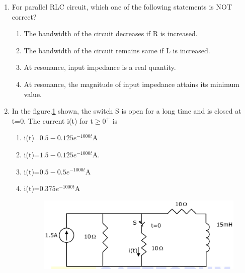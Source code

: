 \documentclass[journal,12pt,twocolumn]{IEEEtran}
\begin{document}
\begin{enumerate}
\item For parallel RLC circuit, which one of the following statements is NOT correct?
\begin{enumerate}
\setlength\itemsep{2em}
\item The bandwidth of the circuit decreases if R is increased.
\item The bandwidth of the circuit remains same if L is increased.
\item At resonance, input impedance is a real quantity.
\item At resonance, the magnitude of input impedance attains its minimum value.
\end{enumerate}

\item In the figure.\ref{fig76} shown, the switch S is open for a long time and is closed at t=0. The
current i(t) for t$\geq0^{+}$ is
\begin{enumerate}
\setlength\itemsep{2em}
\item i(t)=$0.5-0.125e^{-1000t}$A
\item i(t)=$1.5-0.125e^{-1000t}$A.
\item i(t)=$0.5-0.5e^{-1000t}$A
\item i(t)=$0.375e^{-1000t}$A
\begin{figure}[!h]
\begin{center}
\includegraphics[scale=0.5]{./figs/fig76.eps}
\caption{}
\label{fig76}
\end{center}
\end{figure}
\end{enumerate}


\end{enumerate}
\end{document}
